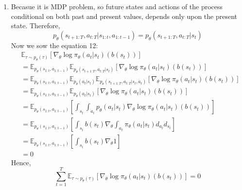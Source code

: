 \documentclass[12pt]{article}
\begin{document}
\begin{enumerate}[label=(\alph*)]
  \newpage
  \item Becasue it is MDP problem, so future states and actions of the process conditional on both past and present values, depends only upon the present state. Therefore,
  $$
  p_\theta(s_{t+1:T}, a_{t:T} | s_{1:t}, a_{1:t-1}) = p_\theta(s_{t+1:T}, a_{t:T} | s_t)
  $$
  Now we sow the equation 12:
  \begin{align*}
   & \mathbb{E}_{\tau \sim p_\theta(\tau)}\left[ \nabla_\theta \log \pi_\theta(a_t|s_t) \left(b(s_t)\right)\right] \\
    &= \mathbb{E}_{p_\theta(s_{1:t}, a_{1:t-1})} \mathbb{E}_{p_\theta(s_{t+1:T}, a_{t:T} | s_t)} \left[ \nabla_\theta \log \pi_\theta(a_t|s_t) \left(b(s_t)\right)\right] \\
    &= \mathbb{E}_{p_\theta(s_{1:t}, a_{1:t-1})} \mathbb{E}_{p_\theta(a_t | s_t)} \mathbb{E}_{p_\theta(s_{t+1:T}, a_{t:T} | s_t, a_t)} \left[ \nabla_\theta \log \pi_\theta(a_t|s_t) \left(b(s_t)\right)\right] \\
    &= \mathbb{E}_{p_\theta(s_{1:t}, a_{1:t-1})} \mathbb{E}_{p_\theta(a_t | s_t)} \left[ \nabla_\theta \log \pi_\theta(a_t|s_t) \left(b(s_t)\right)\right] \\
    &= \mathbb{E}_{p_\theta(s_{1:t}, a_{1:t-1})} \left[\int_{s_t} \int_{a_t} p_\theta(a_t | s_t) \nabla_\theta \log \pi_\theta(a_t|s_t) \left(b(s_t)\right)\right] \\
    &= \mathbb{E}_{p_\theta(s_{1:t}, a_{1:t-1})} \left[\int_{s_t} b(s_t) \nabla_\theta \int_{a_t} \pi_\theta(a_t|s_t) d_{a_t} d_{s_t} \right] \\
    &= \mathbb{E}_{p_\theta(s_{1:t}, a_{1:t-1})} \left[\int_{s_t} b(s_t) \nabla_\theta 1 \right] \\
    &= 0
  \end{align*}
  Hence,
  $$
  \sum_{t=1}^T \mathbb{E}_{\tau \sim p_\theta(\tau)}\left[ \nabla_\theta \log \pi_\theta(a_t|s_t) \left(b(s_t)\right)\right] = 0
  $$

\end{enumerate}

\newpage
\end{document}
